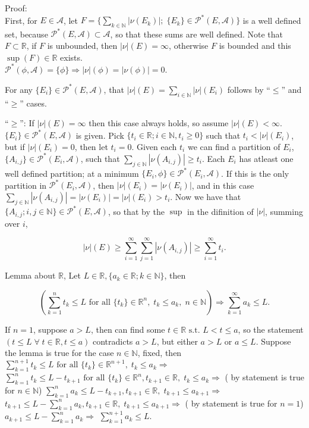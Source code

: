 \documentclass[12pt]{article}
\newcommand{\partset}[1]{ \mathcal{P}^{*}(#1) }
\newcommand{\st}[0]{ \textrm{ s.t. } }
\newcommand{\fall}[0] { \textrm{ for all } }
\newcommand{\rimply}[0] { \Rightarrow }
\newcommand{\nats}[0] { \mathbb{N}}
\newcommand{\reals}[0] { \mathbb{R}}
\newcommand{\A}[0] { \mathcal{A} }
\begin{document}
Proof: \\

\noindent
First, for $E \in \A$, let $ F = \{  \sum_{k \in \nats} |\nu(E_k)| ; \; \{ E_k\} \in \partset{E, \A}  \}$ is a well defined set, because $\partset{E, \A} \subset \A$, so that these sums are well defined. Note that $F \subset \reals$, if $F$ is unbounded, then $|\nu|(E) = \infty$, otherwise $F$ is bounded and this $\sup(F) \in \reals$ exists. \\


\noindent
 $\partset{\phi, \A} = \{ \phi \} \rimply |\nu|(\phi) = |\nu(\phi)| = 0$. 

\noindent 
For any $\{ E_i \} \in \partset{E, \A}$, that $|\nu|(E) = \sum_{i \in \nats} |\nu|(E_i)$ follows by ``$\le$'' and ``$\ge$'' cases. \\


\noindent


\noindent
``$\ge$'': If $|\nu|(E) = \infty$ then this case always holds, so assume $|\nu|(E) < \infty$. $\{ E_i \} \in \partset{ E, \A }$ is given. Pick $\{ t_i \in \reals; i \in \nats, t_i \ge 0 \}$ such that $t_i < |\nu|(E_i)$, but if $|\nu|(E_i) = 0$, then let $t_i = 0$. Given each $t_i$ we can find a partition of $E_i$, $\{A_{i,j} \} \in \partset{E_i, \A}$, such that $\sum_{j \in \nats} |\nu(A_{i,j})| \ge t_i$. Each $E_i$ has atleast one well defined partition; at a minimum $\{E_i, \phi \} \in \partset{E_i, \A}$. If this is the only partition in $\partset{E_i, \A}$, then $|\nu|(E_i) = |\nu(E_i)|$, and in this case $\sum_{j \in \nats} |\nu(A_{i,j})| = |\nu(E_i)| = |\nu|(E_i) > t_i$.  Now we have that $\{ A_{i,j}; i,j \in \nats \} \in \partset{E, \A}$, so that by the $\sup$ in the difinition of $|\nu|$, summing over $i$,

$$    |\nu|(E) \ge \sum_{i =1 }^\infty \sum_{j =1}^\infty |\nu(A_{i,j})| \ge \sum_{i=1}^\infty t_i. $$

\noindent
Lemma about $\reals$, Let $L \in \reals, \{ a_k \in \reals; k \in \nats \}$, then

$$
\left(  \sum_{k=1}^n t_k \le L  \fall \{ t_k \} \in \reals^n, \; t_k \le a_k, \; n \in \nats  \right) \rimply \sum_{k = 1} ^ \infty a_k \le L.
$$

\noindent
If $n=1$, suppose $a > L$, then can find some $t \in \reals \st L < t \le a$, so the statement $ \left( t \le L  \; \forall \; t \in \reals, t \le a \right)$ contradicts $a > L$, but either $a > L$ or  $a \le L$. Suppose the lemma is true for the case $n \in \nats$, fixed, then $  \sum_{k=1}^{n+1} t_k \le L  \fall \{ t_k \} \in \reals^{n+1}, \; t_k \le a_k  \rimply$
$  \sum_{k=1}^{n} t_k \le L-t_{k+1}  \fall \{ t_k \} \in \reals^{n}, t_{k+1} \in \reals, \; t_k \le a_k \rimply$ ( by statement is true for $n \in \nats$)
$  \sum_{k=1}^{n} a_k \le L-t_{k+1},  t_{k+1} \in \reals, \; t_{k+1} \le a_{k+1} \rimply$
$  t_{k+1} \le L-\sum_{k=1}^{n} a_k,  t_{k+1} \in \reals, \; t_{k+1} \le a_{k+1} \rimply$
( by statement is true for $n=1$) $a_{k+1} \le L-\sum_{k=1}^{n} a_k \rimply $  $\sum_{k=1}^{n+1} a_k \le L$. \\
\end{document}

